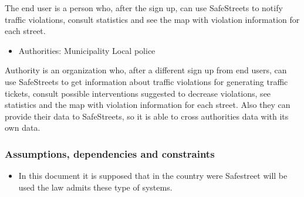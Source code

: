 The end user is a person who, after the sign up, can use SafeStreets to notify traffic violations, consult statistics and see the map with violation information for each street.

\begin{itemize}
	\item Authorities:
	\subitem Municipality
	\subitem Local police
\end{itemize}


Authority is an organization who, after a different sign up from end users, can use SafeStreets to get information about traffic violations for generating traffic tickets, consult possible interventions suggested to decrease violations, see statistics and the map with violation information for each street.
Also they can provide their data to SafeStreets, so it is able to cross authorities data with its own data.

\subsubsection{Assumptions, dependencies and constraints}

\begin{itemize}
	\item 
	In this document it is supposed that in the country were Safestreet will be used the law admits these type of systems.
\end{itemize}



